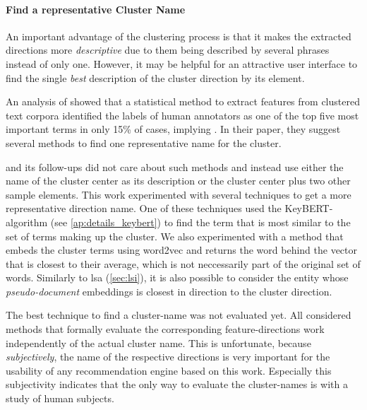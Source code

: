 \paragraph{Find a representative Cluster Name}

An important advantage of the clustering process is that it makes the extracted directions more \textit{descriptive} due to them being described by several phrases instead of only one. However, it may be helpful for an attractive user interface to find the single \textit{best} description of the cluster direction by its element.

An analysis of \cite{Carmel2009} showed that a statistical method to extract features from clustered text corpora identified the labels of human annotators as one of the top five most important terms in only 15\% of cases, implying  \cite[139]{Carmel2009}. In their paper, they suggest several methods to find one representative name for the cluster. 

\textcite{Derrac2015} and its follow-ups \cite{Ager2018,Alshaikh2020} did not care about such methods and instead use either the name of the cluster center as its description or the cluster center plus two other sample elements. This work experimented with several techniques to get a more representative direction name. One of these techniques used the KeyBERT-algorithm (see \autoref{ap:details_keybert}) to find the term that is most similar to the set of terms making up the cluster. We also experimented with a method that embeds the cluster terms using \gls{word2vec} and returns  the word behind the vector that is closest to their average, which is not neccessarily part of the original set of words. Similarly to \gls{lsa} (\autoref{sec:lsi}), it is also possible to consider the entity whose \textit{pseudo-document} embeddings is closest in direction to the cluster direction.

The best technique to find a cluster-name was not evaluated yet. All considered methods that formally evaluate the corresponding feature-directions work independently of the actual cluster name. This is unfortunate, because \textit{subjectively}, the name of the respective directions is very important for the usability of any recommendation engine based on this work. Especially this subjectivity indicates that the only way to evaluate the cluster-names is with a study of human subjects.

\vspace{-1.5ex}
